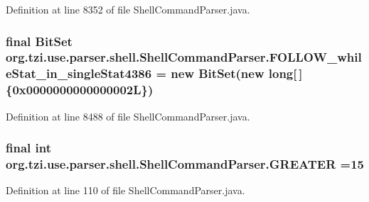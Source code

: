 Definition at line 8352 of file Shell\-Command\-Parser.\-java.

\hypertarget{classorg_1_1tzi_1_1use_1_1parser_1_1shell_1_1_shell_command_parser_a0d4242de0950c563c63d943d3998fc8d}{
\subsubsection[{F\-O\-L\-L\-O\-W\-\_\-while\-Stat\-\_\-in\-\_\-single\-Stat4386}]{\setlength{\rightskip}{0pt plus 5cm}final Bit\-Set org.\-tzi.\-use.\-parser.\-shell.\-Shell\-Command\-Parser.\-F\-O\-L\-L\-O\-W\-\_\-while\-Stat\-\_\-in\-\_\-single\-Stat4386 = new Bit\-Set(new long\mbox{[}$\,$\mbox{]}\{0x0000000000000002\-L\})\hspace{0.3cm}{\ttfamily [static]}}}\label{classorg_1_1tzi_1_1use_1_1parser_1_1shell_1_1_shell_command_parser_a0d4242de0950c563c63d943d3998fc8d}


Definition at line 8488 of file Shell\-Command\-Parser.\-java.

\hypertarget{classorg_1_1tzi_1_1use_1_1parser_1_1shell_1_1_shell_command_parser_a50b78262e4a35a39f7e4625e29456a71}{
\subsubsection[{G\-R\-E\-A\-T\-E\-R}]{\setlength{\rightskip}{0pt plus 5cm}final int org.\-tzi.\-use.\-parser.\-shell.\-Shell\-Command\-Parser.\-G\-R\-E\-A\-T\-E\-R =15\hspace{0.3cm}{\ttfamily [static]}}}\label{classorg_1_1tzi_1_1use_1_1parser_1_1shell_1_1_shell_command_parser_a50b78262e4a35a39f7e4625e29456a71}


Definition at line 110 of file Shell\-Command\-Parser.\-java.

